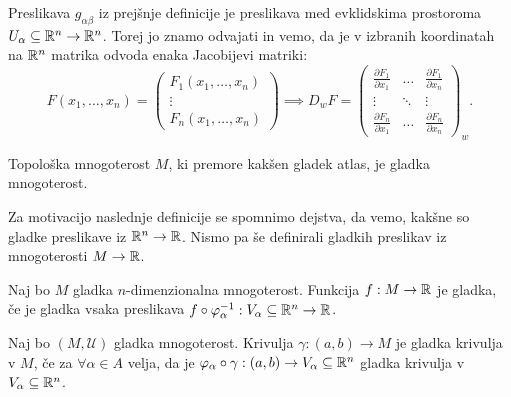 \begin{opomba}
Preslikava $g_{\alpha \beta}$  iz prejšnje definicije
je preslikava med evklidskima prostoroma $U_\alpha \subseteq \mathbb{R} ^n \to
\mathbb{R} ^n$. Torej jo znamo odvajati in vemo, da je v izbranih
koordinatah na $\mathbb{R} ^n$ matrika odvoda enaka Jacobijevi
matriki: \begin{equation*} F\left( x_1, \ldots, x_{n} \right) =
\begin{pmatrix}
F_1(x_1, \dots, x_n)\\ \vdots\\ F_n(x_1, \dots, x_n)
\end{pmatrix}
\implies D_wF = \begin{pmatrix}
\frac{\partial F_1}{\partial x_1} & \dots & \frac{\partial
F_1}{\partial x_n} \\ \vdots & \ddots & \vdots \\
\frac{\partial F_n}{\partial x_1} & \dots & \frac{\partial
F_n}{\partial x_n} \end{pmatrix}_w	. \end{equation*}
\end{opomba}

\begin{definicija}
\label{def_gladka_mnt}
Topološka mnogoterost $M$,
ki premore kakšen gladek atlas, je gladka mnogoterost.
\end{definicija}

Za motivacijo naslednje definicije se spomnimo dejstva, da vemo,
kakšne so gladke preslikave iz $\mathbb{R} ^n \to  \mathbb{R} $. Nismo
pa še definirali gladkih preslikav iz mnogoterosti $M \to \mathbb{R} $. 

\begin{definicija}
\label{def_gladke_preslikave}
Naj bo $M$ gladka $n$-dimenzionalna mnogoterost. Funkcija $f : M \to  \mathbb{R} $ je
gladka, če je gladka vsaka preslikava $f \circ \varphi_\alpha^{-1}
: V_\alpha \subseteq \mathbb{R} ^n \to  \mathbb{R} $.
\end{definicija}


\begin{definicija}
\label{def_gladka_krivulja}
Naj bo $\left( M,\mathcal{U} \right)$  gladka mnogoterost. Krivulja $\gamma :
\left( a, b \right) \to  M$ je gladka krivulja v $M$, če za
$\forall  \alpha \in A$ velja, da je $\varphi_\alpha \circ \gamma
: \left( a, b \right) \to  V_\alpha \subseteq \mathbb{R} ^n$ gladka
krivulja v $V_\alpha \subseteq  \mathbb{R} ^n$.
\end{definicija}

